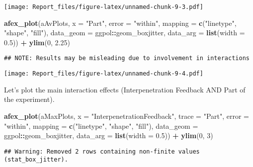 \documentclass[
]{article}
\newenvironment{Shaded}{\begin{snugshade}}{\end{snugshade}}
\newcommand{\DataTypeTok}[1]{\textcolor[rgb]{0.13,0.29,0.53}{#1}}
\newcommand{\DecValTok}[1]{\textcolor[rgb]{0.00,0.00,0.81}{#1}}
\newcommand{\FloatTok}[1]{\textcolor[rgb]{0.00,0.00,0.81}{#1}}
\newcommand{\KeywordTok}[1]{\textcolor[rgb]{0.13,0.29,0.53}{\textbf{#1}}}
\newcommand{\NormalTok}[1]{#1}
\newcommand{\OperatorTok}[1]{\textcolor[rgb]{0.81,0.36,0.00}{\textbf{#1}}}
\newcommand{\StringTok}[1]{\textcolor[rgb]{0.31,0.60,0.02}{#1}}
\begin{document}
\texttt{[image: Report\_files/figure-latex/unnamed-chunk-9-3.pdf]}

\begin{Shaded}
\begin{Highlighting}[]
\KeywordTok{afex_plot}\NormalTok{(aAvPlots, }\DataTypeTok{x =} \StringTok{"Part"}\NormalTok{, }\DataTypeTok{error =} \StringTok{"within"}\NormalTok{, }
                \DataTypeTok{mapping =} \KeywordTok{c}\NormalTok{(}\StringTok{"linetype"}\NormalTok{, }\StringTok{"shape"}\NormalTok{, }\StringTok{"fill"}\NormalTok{),}
                \DataTypeTok{data_geom =}\NormalTok{ ggpol}\OperatorTok{::}\NormalTok{geom_boxjitter, }
                \DataTypeTok{data_arg =} \KeywordTok{list}\NormalTok{(}\DataTypeTok{width =} \FloatTok{0.5}\NormalTok{))  }\OperatorTok{+}
\StringTok{            }\KeywordTok{ylim}\NormalTok{(}\DecValTok{0}\NormalTok{, }\FloatTok{2.25}\NormalTok{)}
\end{Highlighting}
\end{Shaded}

\begin{verbatim}
## NOTE: Results may be misleading due to involvement in interactions
\end{verbatim}

\texttt{[image: Report\_files/figure-latex/unnamed-chunk-9-4.pdf]}

Let's plot the main interaction effects (Interpenetration Feedback AND
Part of the experiment).

\begin{Shaded}
\begin{Highlighting}[]
\KeywordTok{afex_plot}\NormalTok{(aMaxPlots, }\DataTypeTok{x =} \StringTok{"InterpenetrationFeedback"}\NormalTok{, }\DataTypeTok{trace =} \StringTok{"Part"}\NormalTok{, }\DataTypeTok{error =} \StringTok{"within"}\NormalTok{, }
                \DataTypeTok{mapping =} \KeywordTok{c}\NormalTok{(}\StringTok{"linetype"}\NormalTok{, }\StringTok{"shape"}\NormalTok{, }\StringTok{"fill"}\NormalTok{),}
                \DataTypeTok{data_geom =}\NormalTok{ ggpol}\OperatorTok{::}\NormalTok{geom_boxjitter, }
                \DataTypeTok{data_arg =} \KeywordTok{list}\NormalTok{(}\DataTypeTok{width =} \FloatTok{0.5}\NormalTok{)) }\OperatorTok{+}
\StringTok{            }\KeywordTok{ylim}\NormalTok{(}\DecValTok{0}\NormalTok{, }\DecValTok{3}\NormalTok{)}
\end{Highlighting}
\end{Shaded}

\begin{verbatim}
## Warning: Removed 2 rows containing non-finite values (stat_box_jitter).
\end{verbatim}
\end{document}
